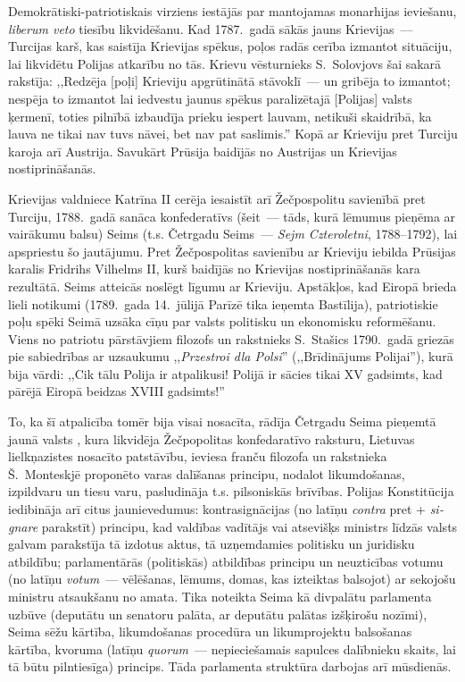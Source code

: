 \documentclass[twoside,a5paper,12pt,fleqn,openany]{extbook}
\newcommand{\pltxti}[1]{\textit{\textpolish{#1}}}
\newcommand{\latxti}[1]{\textit{\textlatin{#1}}}
\begin{document}
Demokrātiski-patriotiskais virziens iestājās par mantojamas monarhijas ieviešanu, \latxti{liberum veto} tiesību likvidēšanu. Kad 1787.~gadā sākās jauns Krievijas~--- Turcijas karš, kas saistīja Krievijas spēkus, poļos radās cerība izmantot situāciju, lai likvidētu Polijas atkarību no tās. Krievu vēsturnieks S.~Solovjovs šai sakarā rakstīja: ,,Redzēja [poļi] Krieviju apgrūtinātā stāvoklī~--- un gribēja to izmantot; nespēja to izmantot lai iedvestu jaunus spēkus paralizētajā [Polijas] valsts ķermenī, toties pilnībā izbaudīja prieku iespert lauvam, netikuši skaidrībā, ka lauva ne tikai nav tuvs nāvei, bet nav pat saslimis.'' Kopā ar Krieviju pret Turciju karoja arī Austrija. Savukārt Prūsija baidījās no Austrijas un Krievijas nostiprināšanās.

Krievijas valdniece Katrīna II cerēja iesaistīt arī Žečpospolitu savienībā pret Turciju, 1788.~gadā sanāca konfederatīvs (šeit~--- tāds, kurā lēmumus pieņēma ar vairākumu balsu) Seims (t.s. Četrgadu Seims~--- \pltxti{Sejm Czteroletni}, 1788--1792), lai apspriestu šo jautājumu. Pret Žečpospolitas savienību ar Krieviju iebilda Prūsijas karalis Fridrihs Vilhelms II, kurš baidījās no Krievijas nostiprināšanās kara rezultātā. Seims atteicās noslēgt līgumu ar Krieviju. Apstākļos, kad Eiropā brieda lieli notikumi (1789.~gada 14.~jūlijā Parīzē tika ieņemta Bastīlija), patriotiskie poļu spēki Seimā uzsāka cīņu par valsts politisku un ekonomisku reformēšanu. Viens no patriotu pārstāvjiem filozofs un rakstnieks S.~Stašics 1790.~gadā griezās pie sabiedrības ar uzsaukumu ,,\pltxti{Przestroi dla Polsi}'' (,,Brīdinājums Polijai''), kurā bija vārdi: ,,Cik tālu Polija ir atpalikusi! Polijā ir sācies tikai XV gadsimts, kad pārējā Eiropā beidzas XVIII gadsimts!''

To, ka šī atpalicība tomēr bija visai nosacīta, rādīja  Četrgadu Seima pieņemtā jaunā valsts , kura likvidēja Žečpopolitas konfedaratīvo raksturu, Lietuvas lielkņazistes nosacīto patstāvību, ieviesa franču filozofa un rakstnieka Š.~Monteskjē proponēto varas dalīšanas principu, nodalot likumdošanas, izpildvaru un tiesu varu, pasludināja t.s. pilsoniskās brīvības. Polijas Konstitūcija iedibināja arī citus jaunievedumus: kontrasignācijas (no latīņu \latxti{contra} pret + \latxti{signare} parakstīt) principu, kad valdības vadītājs vai atsevišķs ministrs līdzās valsts galvam parakstīja tā izdotus aktus, tā uzņemdamies politisku un juridisku atbildību; parlamentārās (politiskās) atbildības principu un neuzticības votumu (no latīņu \latxti{votum}~--- vēlēšanas, lēmums, domas, kas izteiktas balsojot) ar sekojošu ministru atsaukšanu no amata. Tika noteikta Seima kā divpalātu parlamenta uzbūve (deputātu un senatoru palāta, ar deputātu palātas izšķirošu nozīmi), Seima sēžu kārtība, likumdošanas procedūra un likumprojektu balsošanas kārtība, kvoruma (latīņu \latxti{quorum}~--- nepieciešamais sapulces dalībnieku skaits, lai tā būtu pilntiesīga) princips. Tāda parlamenta struktūra darbojas arī mūsdienās.
\end{document}
